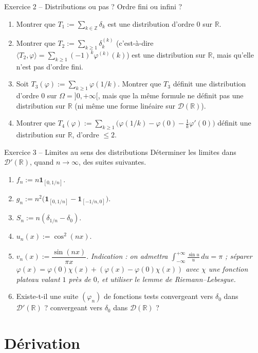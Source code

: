 \documentclass[11pt,a4paper]{article}
\newcommand{\R}{\mathbb{R}}
\newcommand{\Z}{\mathbb{Z}}
\newcommand{\ie}{c'est-à-dire}
\newcommand{\D}{\mathcal{D}}
\theoremstyle{definition}
\begin{document}
\begin{exo}{Exercice 2 -- Distributions ou pas ? Ordre fini ou infini ?}
\begin{enumerate}[label=(\alph*)]
  \item Montrer que $T_1:=\sum_{k\in\Z}\delta_k$ est une distribution d'ordre $0$ sur $\R$.
  \item Montrer que $T_2:=\sum_{k\ge1}\delta_k^{(k)}$ (\ie\ $\langle T_2,\varphi\rangle=\sum_{k\ge1}(-1)^k\varphi^{(k)}(k)$) est une distribution sur $\R$, mais qu'elle n'est pas d'ordre fini.
  \item Soit $T_3(\varphi):=\sum_{k\ge1}\varphi(1/k)$. Montrer que $T_3$ définit une distribution d'ordre $0$ sur $\Omega=]0,+\infty[$, mais que la même formule ne définit pas une distribution sur $\R$ (ni même une forme linéaire sur $\D(\R)$).
  \item Montrer que $T_4(\varphi):=\sum_{k\ge1}\big(\varphi(1/k)-\varphi(0)-\tfrac1k\varphi'(0)\big)$ définit une distribution sur $\R$, d'ordre $\le2$.
\end{enumerate}
\end{exo}

\begin{exo}{Exercice 3 -- Limites au sens des distributions}
Déterminer les limites dans $\D'(\R)$, quand $n\to\infty$, des suites suivantes.
\begin{enumerate}[label=(\alph*)]
  \item $f_n:=n\mathbf 1_{[0,1/n]}$.
  \item $g_n:=n^2\big(\mathbf 1_{[0,1/n]}-\mathbf 1_{[-1/n,0]}\big)$.
  \item $S_n:=n(\delta_{1/n}-\delta_0)$.
  \item $u_n(x):=\cos^2(nx)$.
  \item $v_n(x):=\dfrac{\sin(nx)}{\pi x}$. \emph{Indication : on admettra $\int_{-\infty}^{+\infty}\frac{\sin u}u\,du=\pi$ ; séparer $\varphi(x)=\varphi(0)\chi(x)+(\varphi(x)-\varphi(0)\chi(x))$ avec $\chi$ une fonction plateau valant $1$ près de $0$, et utiliser le lemme de Riemann--Lebesgue.}
  \item Existe-t-il une suite $(\varphi_n)$ de fonctions tests convergeant vers $\delta_0$ dans $\D'(\R)$ ? convergeant vers $\delta_0$ dans $\D(\R)$ ?
\end{enumerate}
\end{exo}

\section*{Dérivation}
\end{document}
